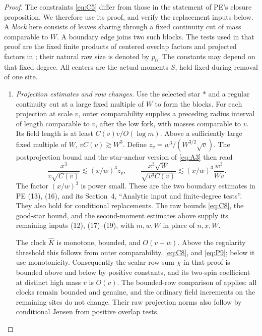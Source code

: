 \begin{proof}
The constraints \eqref{eq:C5} differ from those in the statement of
PE's closure proposition. We therefore use its proof, and verify the
replacement inputs below. A \emph{block} here consists of leaves sharing
through a fixed continuity cut of mass comparable to \(W\). A boundary
edge joins two such blocks. The tests used in that proof are the fixed finite products of centered
overlap factors and projected factors in \cite[Definition~4.2]{PE};
their natural raw size is denoted by \(p_0\).
The constants may depend on that fixed degree. All centers are the
actual moments \(S\), held fixed during removal of one site.

\begin{enumerate}[label=(\roman*)]
\item \emph{Projection estimates and row changes.}
Use the selected star \(*\) and a regular continuity cut at a large
fixed multiple of \(W\) to form the blocks. For each projection at
scale \(v\), outer comparability supplies a preceding radius interval
of length comparable to \(v\), after the low fork, with masses
comparable to \(v\). Its field length is at least
\(C(v)v/O(\log m)\). Above a sufficiently large fixed multiple of
\(W\), \(vC(v)\gtrsim W^3\). Define
\(z_v=w^3/(W^{3/2}\sqrt v)\). The postprojection bound and the
star-anchor version of \eqref{eq:A3} then read
\[
 \frac{x^3}{v\sqrt{C(v)}}
 \lesssim (x/w)^3 z_v,
 \qquad
 \frac{x^3\sqrt W}{\sqrt{v^3C(v)}}
 \lesssim (x/w)^3\frac{w^3}{Wv}.
\]
The factor \((x/w)^3\) is power small. These are the two boundary
estimates in PE (13), (16), and its Section~4, ``Analytic input and
finite-degree tests''. They also hold for conditional replacements.
The raw bounds \eqref{eq:C8}, the good-star bound, and the second-moment
estimates above supply its remaining inputs (12), (17)--(19), with
\(m,w,W\) in place of \(n,x,W\).

The clock \(\widehat K\) is monotone, bounded, and \(O(v+w)\).
Above the regularity threshold this follows from outer comparability,
\eqref{eq:C8}, and \eqref{eq:P9}; below it use monotonicity.
Consequently the scalar row sum \(\chi\) in that proof is bounded
above and below by positive constants, and its two-spin coefficient
at distinct high mass \(v\) is \(O(v)\).
The bounded-row comparison of \cite[Lemma~4.3]{PE} applies: all
clocks remain bounded and genuine, and the ordinary field increments
on the remaining sites do not change. Their raw projection norms also
follow by conditional Jensen from positive overlap tests.


\end{enumerate}
\end{proof}
